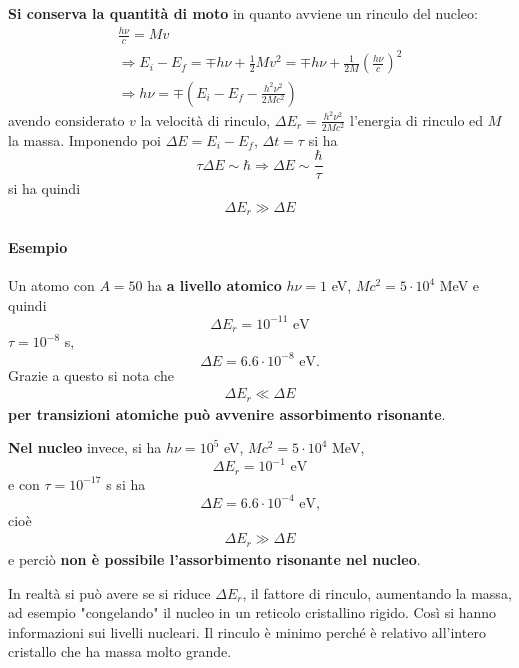 \documentclass[a4paper,11pt,twoside,openany]{book}
\theoremstyle{definition}
\theoremstyle{plain}
\theoremstyle{plain}
\theoremstyle{definition}
\begin{document}
\textbf{Si conserva la quantità di moto} in quanto avviene un rinculo del nucleo:
\begin{equation}\begin{split}
\frac{h\nu}{c}=Mv\\
\Longrightarrow E_i-E_f=\mp h\nu+\frac{1}{2}Mv^2=\mp h\nu+\frac{1}{2M}\left(\frac{h\nu}{c}\right)^2\\
\Longrightarrow h\nu=\mp\left(E_i-E_f-\frac{h^2\nu^2}{2M c^2}\right)
\end{split}\end{equation}
avendo considerato $v$ la velocità di rinculo, $\Delta E_r=\frac{h^2\nu^2}{2M c^2}$ l'energia di rinculo ed $M$ la massa. Imponendo poi $\Delta E=E_i-E_f$, $\Delta t=\tau$ si ha $$\tau\Delta E\sim \hbar \Longrightarrow \Delta E\sim \frac{\hbar }{\tau}$$ si ha quindi
\begin{equation}\begin{split}
\Delta E_r\gg\Delta E
\end{split}\end{equation}

\paragraph{Esempio} Un atomo con $A=50$ ha \textbf{a livello atomico} $h\nu=1$ eV, $Mc^2=5\cdot 10^4$ MeV e quindi $$\Delta E_r=10^{-11} \textrm{ eV}$$ $\tau=10^{-8}$ s, $$\Delta E=6.6\cdot 10^{-8} \textrm{ eV.}$$ Grazie a questo si nota che
\begin{equation}\begin{split}
\Delta E_r\ll\Delta E
\end{split}\end{equation}
\textbf{per transizioni atomiche può avvenire assorbimento risonante}.

\textbf{Nel nucleo} invece, si ha $h\nu=10^5$ eV, $Mc^2=5\cdot 10^{4}$ MeV, $$\Delta E_r=10^{-1} \textrm{ eV}$$ e con $\tau=10^{-17}$ s si ha $$\Delta E=6.6\cdot 10^{-4} \textrm{ eV,}$$ cioè
\begin{equation}\begin{split}
\Delta E_r\gg\Delta E
\end{split}\end{equation}
e perciò \textbf{non è possibile l'assorbimento risonante nel nucleo}.

In realtà si può avere se si riduce $\Delta E_r$, il fattore di rinculo, aumentando la massa, ad esempio "congelando" il nucleo in un reticolo cristallino rigido. Così si hanno informazioni sui livelli nucleari. Il rinculo è minimo perché è relativo all'intero cristallo che ha massa molto grande.
\end{document}
